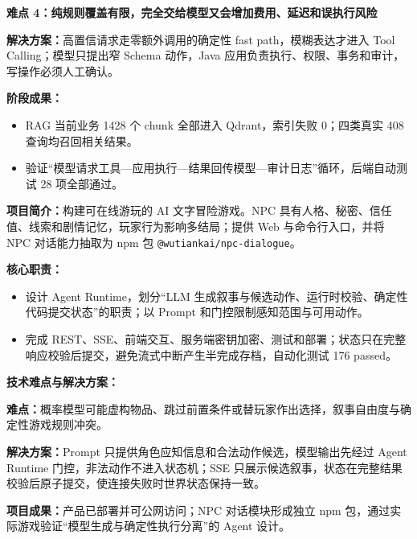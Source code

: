 \vspace{0.5ex}
\textbf{难点 4：纯规则覆盖有限，完全交给模型又会增加费用、延迟和误执行风险}

\textbf{解决方案：}高置信请求走零额外调用的确定性 fast path，模糊表达才进入 Tool Calling；模型只提出窄 Schema 动作，Java 应用负责执行、权限、事务和审计，写操作必须人工确认。

\textbf{阶段成果：}
\begin{itemize}[parsep=0.5ex]
  \item RAG 当前业务 1428 个 chunk 全部进入 Qdrant，索引失败 0；四类真实 408 查询均召回相关结果。
  \item 验证“模型请求工具—应用执行—结果回传模型—审计日志”循环，后端自动测试 28 项全部通过。
\end{itemize}


\textbf{项目简介：}构建可在线游玩的 AI 文字冒险游戏。NPC 具有人格、秘密、信任值、线索和剧情记忆，玩家行为影响多结局；提供 Web 与命令行入口，并将 NPC 对话能力抽取为 npm 包 \texttt{@wutiankai/npc-dialogue}。

\textbf{核心职责：}
\begin{itemize}[parsep=0.5ex]
  \item 设计 Agent Runtime，划分“LLM 生成叙事与候选动作、运行时校验、确定性代码提交状态”的职责；以 Prompt 和门控限制感知范围与可用动作。
  \item 完成 REST、SSE、前端交互、服务端密钥加密、测试和部署；状态只在完整响应校验后提交，避免流式中断产生半完成存档，自动化测试 176 passed。
\end{itemize}

\textbf{技术难点与解决方案：}

\textbf{难点：}概率模型可能虚构物品、跳过前置条件或替玩家作出选择，叙事自由度与确定性游戏规则冲突。

\textbf{解决方案：}Prompt 只提供角色应知信息和合法动作候选，模型输出先经过 Agent Runtime 门控，非法动作不进入状态机；SSE 只展示候选叙事，状态在完整结果校验后原子提交，使连接失败时世界状态保持一致。

\textbf{项目成果：}产品已部署并可公网访问；NPC 对话模块形成独立 npm 包，通过实际游戏验证“模型生成与确定性执行分离”的 Agent 设计。

